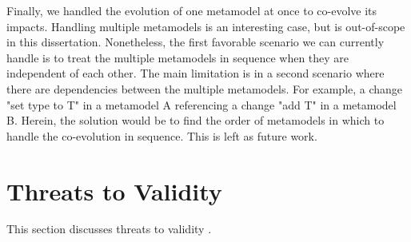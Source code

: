 	Finally, we handled the evolution of one metamodel at once to co-evolve its impacts. Handling multiple metamodels is an interesting case, but is out-of-scope in this dissertation. Nonetheless, the first favorable scenario we can currently handle is to treat the multiple metamodels in sequence when they are independent of each other. The main limitation is in a second scenario where there are dependencies between the multiple metamodels. For example, a change "set type to T" in a metamodel A referencing a change "add T" in a metamodel B. Herein, the solution would be to find the order of metamodels in which to handle the co-evolution in sequence. This is left as future work. 
	
	\section{Threats to Validity}\label{ch1_threat}
	\noindent This section discusses threats to validity \cite{wohlin2012experimentation}.
	
